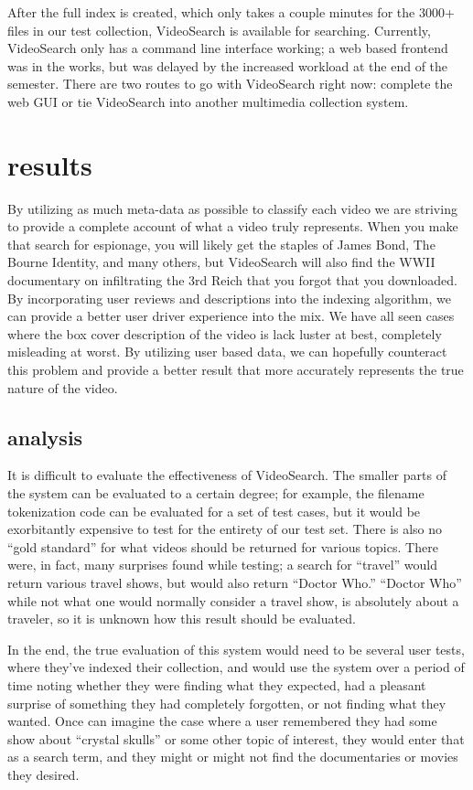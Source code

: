 \documentclass{acm_proc_article-sp}
\begin{document}
After the full index is created, which only takes a couple minutes for the 3000+ files in our test collection, VideoSearch is available for searching.  Currently, VideoSearch only has a command line interface working; a web based frontend was in the works, but was delayed by the increased workload at the end of the semester.  There are two routes to go with VideoSearch right now: complete the web GUI or tie VideoSearch into another multimedia collection system.


\section{results}
    By utilizing as much meta-data as possible to classify each video we are striving to provide a complete account of what a video truly represents. When you make that search for espionage, you will likely get the staples of James Bond, The Bourne Identity, and many others, but VideoSearch will also find the WWII documentary on infiltrating the 3rd Reich that you forgot that you downloaded.
    By incorporating user reviews and descriptions into the indexing algorithm, we can provide a better user driver experience into the mix. We have all seen cases where the box cover description of the video is lack luster at best, completely misleading at worst. By utilizing user based data, we can hopefully counteract this problem and provide a better result that more accurately represents the true nature of the video.

   


\subsection{analysis}

It is difficult to evaluate the effectiveness of VideoSearch. The smaller parts of the system can be evaluated to a certain degree; for example, the filename tokenization code can be evaluated for a set of test cases, but it would be exorbitantly expensive to test for the entirety of our test set.  There is also no “gold standard” for what videos should be returned for various topics.  There were, in fact, many surprises found while testing; a search for “travel” would return various travel shows, but would also return “Doctor Who.”  “Doctor Who” while not what one would normally consider a travel show, is absolutely about a traveler, so it is unknown how this result should be evaluated.

In the end, the true evaluation of this system would need to be several user tests, where they’ve indexed their collection, and would use the system over a period of time noting whether they were finding what they expected, had a pleasant surprise of something they had completely forgotten, or not finding what they wanted.  Once can imagine the case where a user remembered they had some show about “crystal skulls” or some other topic of interest, they would enter that as a search term, and they might or might not find the documentaries or movies they desired.
\end{document}
